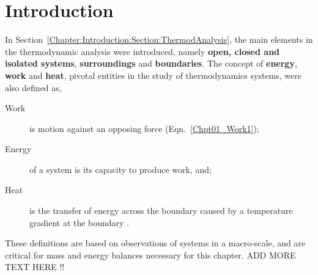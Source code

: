    
     \section{Introduction}\label{Chapter:FirstLaw:Section:Intro}
     In Section~\ref{Chapter:Introduction:Section:ThermodAnalysis}, the main elements in the thermodynamic analysis were introduced, namely {\bf open, closed and isolated systems}, {\bf surroundings} and {\bf boundaries}. The concept of {\bf energy}, {\bf work} and {\bf heat}, pivotal entities in the study of thermodynamics systems, were also defined as,
     \begin{description}
        \item[Work] is motion against an opposing force (Eqn.~\ref{Chpt01_Work1});
        \item[Energy] of a system is its capacity to produce work, and; 
        \item[Heat] is the transfer of energy across the boundary caused by a temperature gradient at the boundary \citep{Devoe_Book}.
     \end{description}
     These definitions are based on observations of systems in a macro-scale, and are critical for mass and energy balances necessary for this chapter. ADD MORE TEXT HERE !!

